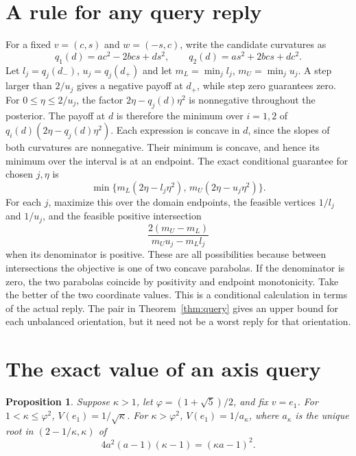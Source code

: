 \documentclass[11pt]{article}
\newtheorem{proposition}[theorem]{Proposition}
\begin{document}
\section{A rule for any query reply}

For a fixed \(v=(c,s)\) and \(w=(-s,c)\), write the candidate curvatures as
\[
 q_1(d)=ac^2-2bcs+ds^2,\qquad
 q_2(d)=as^2+2bcs+dc^2.
\]
Let \(l_j=q_j(d_-)\), \(u_j=q_j(d_+)\) and let
\(m_L=\min_jl_j\), \(m_U=\min_ju_j\). A step larger than \(2/u_j\)
gives a negative payoff at \(d_+\), while step zero guarantees zero.
For \(0\le\eta\le2/u_j\), the factor \(2\eta-q_j(d)\eta^2\)
is nonnegative throughout the posterior. The payoff at \(d\) is
therefore the minimum over \(i=1,2\) of
\(q_i(d)(2\eta-q_j(d)\eta^2)\). Each expression is concave in \(d\),
since the slopes of both curvatures are nonnegative. Their minimum
is concave, and hence its minimum over the interval is at an endpoint.
The exact conditional guarantee for chosen \(j,\eta\) is
\begin{equation}
 \min\{m_L(2\eta-l_j\eta^2),\,m_U(2\eta-u_j\eta^2)\}.
 \label{eq:conditional}
\end{equation}
For each \(j\), maximize this over the domain endpoints, the
feasible vertices \(1/l_j\) and \(1/u_j\), and the feasible positive
intersection
\[
 \frac{2(m_U-m_L)}{m_Uu_j-m_Ll_j}
\]
when its denominator is positive. These are all possibilities because
between intersections the objective is one of two concave parabolas.
If the denominator is zero, the two parabolas coincide by positivity
and endpoint monotonicity. Take the better of the two coordinate
values. This is a conditional calculation in terms of the actual
reply. The pair in Theorem~\ref{thm:query} gives an upper bound for
each unbalanced orientation, but it need not be a worst reply for
that orientation.

\section{The exact value of an axis query}

\begin{proposition}\label{prop:axis}
Suppose \(\kappa>1\), let \(\varphi=(1+\sqrt5)/2\), and fix \(v=e_1\).
For \(1<\kappa\le\varphi^2\), \(V(e_1)=1/\sqrt\kappa\).
For \(\kappa>\varphi^2\), \(V(e_1)=1/a_\kappa\), where
\(a_\kappa\) is the unique root in \((2-1/\kappa,\kappa)\) of
\[
 4a^2(a-1)(\kappa-1)=(\kappa a-1)^2 .
\]
\end{proposition}
\end{document}
